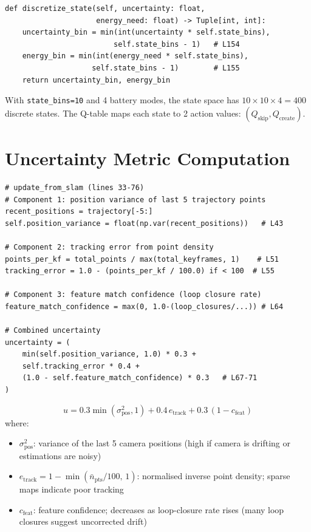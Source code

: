 \documentclass[12pt,a4paper,twoside]{report}
\theoremstyle{definition}
\newcommand{\code}[1]{\texttt{#1}}
\begin{document}
\begin{lstlisting}
def discretize_state(self, uncertainty: float,
                     energy_need: float) -> Tuple[int, int]:
    uncertainty_bin = min(int(uncertainty * self.state_bins),
                         self.state_bins - 1)   # L154
    energy_bin = min(int(energy_need * self.state_bins),
                    self.state_bins - 1)        # L155
    return uncertainty_bin, energy_bin
\end{lstlisting}

With \code{state\_bins=10} and 4 battery modes, the state space has
$10 \times 10 \times 4 = 400$ discrete states. The Q-table maps each state
to 2 action values: $(Q_{\text{skip}}, Q_{\text{create}})$.

\section{Uncertainty Metric Computation}

\begin{lstlisting}
# update_from_slam (lines 33-76)
# Component 1: position variance of last 5 trajectory points
recent_positions = trajectory[-5:]
self.position_variance = float(np.var(recent_positions))   # L43

# Component 2: tracking error from point density
points_per_kf = total_points / max(total_keyframes, 1)    # L51
tracking_error = 1.0 - (points_per_kf / 100.0) if < 100  # L55

# Component 3: feature match confidence (loop closure rate)
feature_match_confidence = max(0, 1.0-(loop_closures/...)) # L64

# Combined uncertainty
uncertainty = (
    min(self.position_variance, 1.0) * 0.3 +
    self.tracking_error * 0.4 +
    (1.0 - self.feature_match_confidence) * 0.3   # L67-71
)
\end{lstlisting}

\begin{mathbox}
\[
  u = 0.3 \min(\sigma^2_\text{pos}, 1) + 0.4\, e_\text{track} + 0.3\,(1 - c_\text{feat})
\]
where:
\begin{itemize}
  \item $\sigma^2_\text{pos}$: variance of the last 5 camera positions
        (high if camera is drifting or estimations are noisy)
  \item $e_\text{track} = 1 - \min(\bar{n}_{\text{pts}}/100,\, 1)$: normalised
        inverse point density; sparse maps indicate poor tracking
  \item $c_\text{feat}$: feature confidence; decreases as loop-closure rate rises
        (many loop closures suggest uncorrected drift)
\end{itemize}
\end{mathbox}
\end{document}
